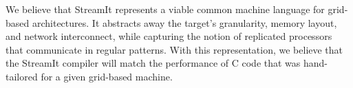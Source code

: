 \documentclass{sig-alternate}
\begin{document}
We believe that StreamIt represents a viable common machine language
for grid-based architectures.  It abstracts away the target's
granularity, memory layout, and network interconnect, while capturing
the notion of replicated processors that communicate in regular
patterns.  With this representation, we believe that the StreamIt
compiler will match the performance of C code that was hand-tailored
for a given grid-based machine.


\begin{small}


\end{small}
\end{document}
